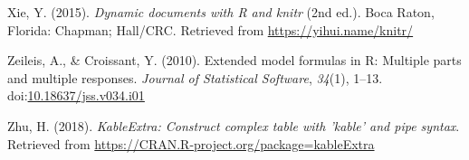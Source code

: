 \documentclass[man, noextraspace]{apa6}
\theoremstyle{definition}
\theoremstyle{definition}
\theoremstyle{definition}
\theoremstyle{remark}
\begin{document}
\hypertarget{ref-R-knitr}{}
Xie, Y. (2015). \emph{Dynamic documents with R and knitr} (2nd ed.).
Boca Raton, Florida: Chapman; Hall/CRC. Retrieved from
\url{https://yihui.name/knitr/}

\hypertarget{ref-R-Formula}{}
Zeileis, A., \& Croissant, Y. (2010). Extended model formulas in R:
Multiple parts and multiple responses. \emph{Journal of Statistical
Software}, \emph{34}(1), 1--13.
doi:\href{https://doi.org/10.18637/jss.v034.i01}{10.18637/jss.v034.i01}

\hypertarget{ref-R-kableExtra}{}
Zhu, H. (2018). \emph{KableExtra: Construct complex table with 'kable'
and pipe syntax}. Retrieved from
\url{https://CRAN.R-project.org/package=kableExtra}

\endgroup
\end{document}
